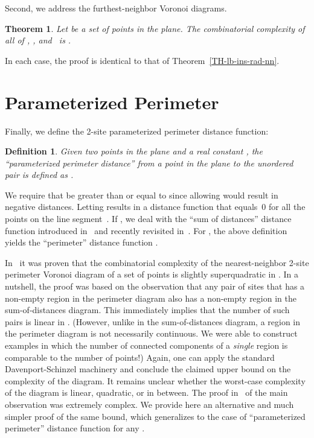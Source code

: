 \documentclass[10pt, conference, compsocconf]{IEEEtran}
\newtheorem{theorem}{Theorem}
\newtheorem{definition}{Definition}
\begin{document}
Second, we address the furthest-neighbor Voronoi diagrams.

\begin{theorem}
   Let  be a set of  points in the plane.
   The combinatorial complexity of all of ,
   , and~ is .
\end{theorem}

In each case, the proof is identical to that of
Theorem~\ref{TH-lb-ins-rad-nn}.



\section{Parameterized Perimeter}

Finally, we define the 2-site parameterized perimeter distance function:
\begin{definition}
   Given two points  in the plane and a real constant ,
   the ``parameterized perimeter distance''  from a point  in
   the plane to the unordered pair  is
   defined as .
\end{definition}

We require that  be greater than or equal to  since allowing
 would result in negative distances.  Letting  results in a
distance function that equals~0 for all the points on the line segment~.
 If , we deal with the ``sum of distances'' distance function
introduced in~\cite{BDD02} and recently revisited in~\cite{VB10}.
For , the above definition yields the ``perimeter'' distance function
.

In~\cite{HB09} it was proven that the combinatorial complexity of the
nearest-neighbor 2-site perimeter Voronoi diagram of a set of  points is slightly
superquadratic in .  In a nutshell, the proof was based
on the observation that any pair of sites that has a non-empty region in
the perimeter diagram also has a non-empty region in the sum-of-distances
diagram.  This immediately implies that the number of such pairs is
linear in .  (However, unlike in the sum-of-distances
diagram, a region in the perimeter diagram is not necessarily continuous.
We were able to construct examples in which the number of connected
components of a \emph{single} region is comparable to the number of points!)
Again, one can apply the standard Davenport-Schinzel machinery and
conclude the claimed upper bound on the complexity of the diagram.
It remains unclear whether the worst-case complexity of the diagram is
linear, quadratic, or in between.
The proof in~\cite{HB09} of the main observation was extremely complex.
We provide here an alternative and much simpler proof of the same bound,
which generalizes to the case of ``parameterized perimeter'' distance
function for any .
\end{document}
